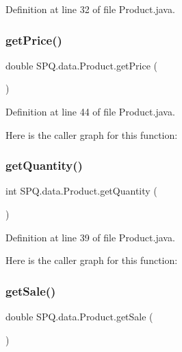 Definition at line 32 of file Product.\+java.

\mbox{\label{class_s_p_q_1_1data_1_1_product_ad8200addd74d2e3b6ea9cfff4e8b8c7e}} 
\subsubsection{\texorpdfstring{get\+Price()}{getPrice()}\hspace{0.1cm}{\footnotesize\ttfamily [2/2]}}
{\footnotesize\ttfamily double S\+P\+Q.\+data.\+Product.\+get\+Price (\begin{DoxyParamCaption}{ }\end{DoxyParamCaption})}



Definition at line 44 of file Product.\+java.

Here is the caller graph for this function\+:
\mbox{\label{class_s_p_q_1_1data_1_1_product_a1bcbc2a00b31563677cea1ab4cb8095c}} 
\subsubsection{\texorpdfstring{get\+Quantity()}{getQuantity()}}
{\footnotesize\ttfamily int S\+P\+Q.\+data.\+Product.\+get\+Quantity (\begin{DoxyParamCaption}{ }\end{DoxyParamCaption})}



Definition at line 39 of file Product.\+java.

Here is the caller graph for this function\+:
\mbox{\label{class_s_p_q_1_1data_1_1_product_a07ba2dea61bb96215609776cc4d7058d}} 
\subsubsection{\texorpdfstring{get\+Sale()}{getSale()}\hspace{0.1cm}{\footnotesize\ttfamily [1/2]}}
{\footnotesize\ttfamily double S\+P\+Q.\+data.\+Product.\+get\+Sale (\begin{DoxyParamCaption}{ }\end{DoxyParamCaption})}



